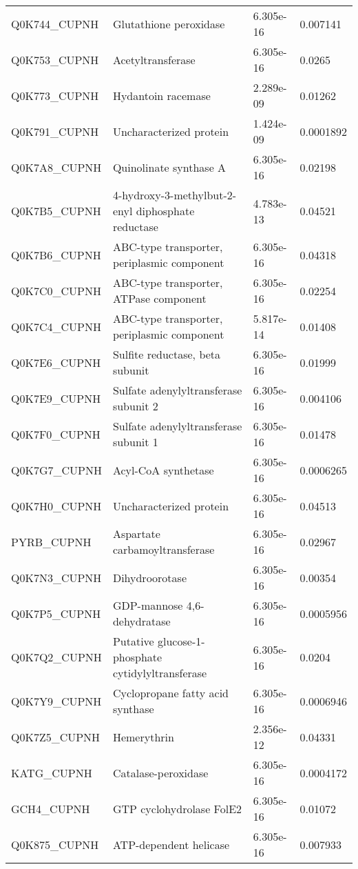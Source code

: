 \begin{center}
\begin{longtable}{ l l l l }
Q0K744\_CUPNH & Glutathione peroxidase& 6.305e-16 & 0.007141 \\ [0.5ex]
Q0K753\_CUPNH & Acetyltransferase& 6.305e-16 & 0.0265 \\ [0.5ex]
Q0K773\_CUPNH & Hydantoin racemase& 2.289e-09 & 0.01262 \\ [0.5ex]
Q0K791\_CUPNH & Uncharacterized protein& 1.424e-09 & 0.0001892 \\ [0.5ex]
Q0K7A8\_CUPNH & Quinolinate synthase A& 6.305e-16 & 0.02198 \\ [0.5ex]
Q0K7B5\_CUPNH & 4-hydroxy-3-methylbut-2-enyl diphosphate reductase& 4.783e-13 & 0.04521 \\ [0.5ex]
Q0K7B6\_CUPNH & ABC-type transporter, periplasmic component & 6.305e-16 & 0.04318 \\ [0.5ex]
Q0K7C0\_CUPNH & ABC-type transporter, ATPase component& 6.305e-16 & 0.02254 \\ [0.5ex]
Q0K7C4\_CUPNH & ABC-type transporter, periplasmic component& 5.817e-14 & 0.01408 \\ [0.5ex]
Q0K7E6\_CUPNH & Sulfite reductase, beta subunit& 6.305e-16 & 0.01999 \\ [0.5ex]
Q0K7E9\_CUPNH & Sulfate adenylyltransferase subunit 2& 6.305e-16 & 0.004106 \\ [0.5ex]
Q0K7F0\_CUPNH & Sulfate adenylyltransferase subunit 1& 6.305e-16 & 0.01478 \\ [0.5ex]
Q0K7G7\_CUPNH & Acyl-CoA synthetase& 6.305e-16 & 0.0006265 \\ [0.5ex]
Q0K7H0\_CUPNH & Uncharacterized protein& 6.305e-16 & 0.04513 \\ [0.5ex]
PYRB\_CUPNH & Aspartate carbamoyltransferase& 6.305e-16 & 0.02967 \\ [0.5ex]
Q0K7N3\_CUPNH & Dihydroorotase& 6.305e-16 & 0.00354 \\ [0.5ex]
Q0K7P5\_CUPNH & GDP-mannose 4,6-dehydratase& 6.305e-16 & 0.0005956 \\ [0.5ex]
Q0K7Q2\_CUPNH & Putative glucose-1-phosphate cytidylyltransferase& 6.305e-16 & 0.0204 \\ [0.5ex]
Q0K7Y9\_CUPNH & Cyclopropane fatty acid synthase& 6.305e-16 & 0.0006946 \\ [0.5ex]
Q0K7Z5\_CUPNH & Hemerythrin& 2.356e-12 & 0.04331 \\ [0.5ex]
KATG\_CUPNH & Catalase-peroxidase& 6.305e-16 & 0.0004172 \\ [0.5ex]
GCH4\_CUPNH & GTP cyclohydrolase FolE2& 6.305e-16 & 0.01072 \\ [0.5ex]
Q0K875\_CUPNH & ATP-dependent helicase & 6.305e-16 & 0.007933 \\ [0.5ex]

\end{longtable}
\end{center}
